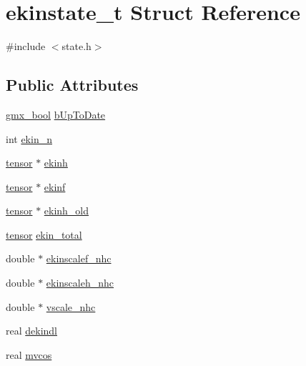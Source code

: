 \hypertarget{structekinstate__t}{\section{ekinstate\-\_\-t \-Struct \-Reference}
\label{structekinstate__t}
}


{\ttfamily \#include $<$state.\-h$>$}

\subsection*{\-Public \-Attributes}
\begin{DoxyCompactItemize}
\item 
\hyperlink{include_2types_2simple_8h_a8fddad319f226e856400d190198d5151}{gmx\-\_\-bool} \hyperlink{structekinstate__t_a7715d4e7e8ae7fa7f29a456a6929f753}{b\-Up\-To\-Date}
\item 
int \hyperlink{structekinstate__t_a126e865bc31a905c607ffbe035b6513f}{ekin\-\_\-n}
\item 
\hyperlink{share_2template_2gromacs_2types_2simple_8h_aef0bf341f56ce75f09dbb64350488a61}{tensor} $\ast$ \hyperlink{structekinstate__t_a53d30ab31bd17b97d2afbdfa3852f15c}{ekinh}
\item 
\hyperlink{share_2template_2gromacs_2types_2simple_8h_aef0bf341f56ce75f09dbb64350488a61}{tensor} $\ast$ \hyperlink{structekinstate__t_a62d747b285c83255a87ae38254ed3c08}{ekinf}
\item 
\hyperlink{share_2template_2gromacs_2types_2simple_8h_aef0bf341f56ce75f09dbb64350488a61}{tensor} $\ast$ \hyperlink{structekinstate__t_a092530c1c243d7a4cafeb7788e54f2f3}{ekinh\-\_\-old}
\item 
\hyperlink{share_2template_2gromacs_2types_2simple_8h_aef0bf341f56ce75f09dbb64350488a61}{tensor} \hyperlink{structekinstate__t_abc5d44d371197d96a1c0020e3aff8772}{ekin\-\_\-total}
\item 
double $\ast$ \hyperlink{structekinstate__t_a9b5690bb66a9c84e9431243a8158b20e}{ekinscalef\-\_\-nhc}
\item 
double $\ast$ \hyperlink{structekinstate__t_ae6a807a0b51765d7d8a8de435c751886}{ekinscaleh\-\_\-nhc}
\item 
double $\ast$ \hyperlink{structekinstate__t_a2a06763c153db0e561494680f7bd6eb8}{vscale\-\_\-nhc}
\item 
real \hyperlink{structekinstate__t_ac501ff85da4e6e774e195195cde0f2f4}{dekindl}
\item 
real \hyperlink{structekinstate__t_a491bf8fbb3b38d54119245ee42120e92}{mvcos}
\end{DoxyCompactItemize}


